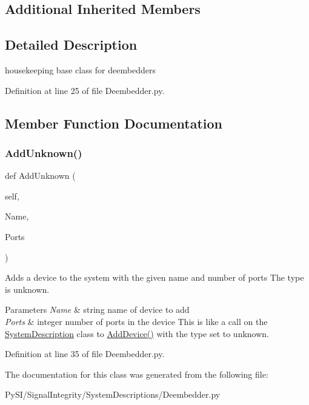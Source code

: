 \subsection*{Additional Inherited Members}


\subsection{Detailed Description}
housekeeping base class for deembedders 

Definition at line 25 of file Deembedder.\+py.



\subsection{Member Function Documentation}
\mbox{\label{classSignalIntegrity_1_1SystemDescriptions_1_1Deembedder_1_1Deembedder_a5ce06adeeb4dc8990aede7800d72a081}} 
\subsubsection{\texorpdfstring{Add\+Unknown()}{AddUnknown()}}
{\footnotesize\ttfamily def Add\+Unknown (\begin{DoxyParamCaption}\item[{}]{self,  }\item[{}]{Name,  }\item[{}]{Ports }\end{DoxyParamCaption})}



Adds a device to the system with the given name and number of ports The type is \textquotesingle{}unknown\textquotesingle{}. 


\begin{DoxyParams}{Parameters}
{\em Name} & string name of device to add \\
\hline
{\em Ports} & integer number of ports in the device This is like a call on the \hyperlink{namespaceSignalIntegrity_1_1SystemDescriptions_1_1SystemDescription}{System\+Description} class to \hyperlink{classSignalIntegrity_1_1SystemDescriptions_1_1SystemDescription_1_1SystemDescription_a377579b9eda21744cf7c7b48df997367}{Add\+Device()} with the type set to \textquotesingle{}unknown\textquotesingle{}. \\
\hline
\end{DoxyParams}


Definition at line 35 of file Deembedder.\+py.



The documentation for this class was generated from the following file\+:\begin{DoxyCompactItemize}
\item 
Py\+S\+I/\+Signal\+Integrity/\+System\+Descriptions/Deembedder.\+py\end{DoxyCompactItemize}
